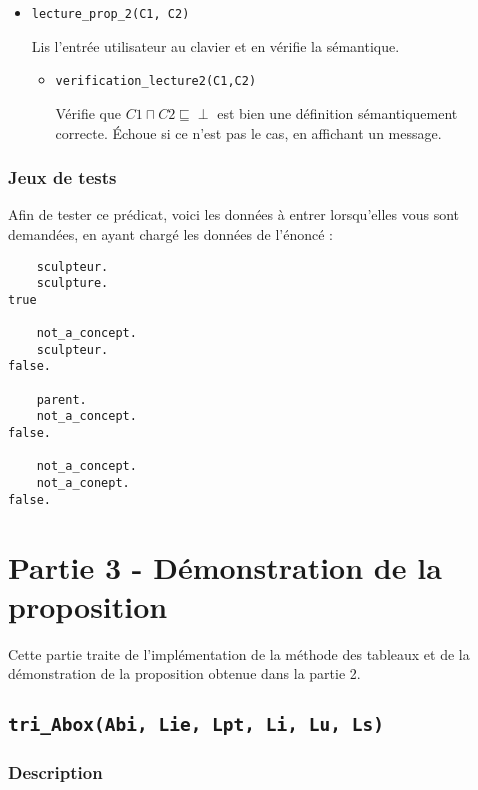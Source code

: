 \documentclass{article}
\newcommand{\code}[1]{\colorbox{light-gray}{\texttt{#1}}}
\begin{document}
\begin{itemize}

    \item \code{lecture\_prop\_2(C1, C2)}

    Lis l'entrée utilisateur au clavier et en vérifie la sémantique.
    
    \begin{itemize}
        \item \code{verification\_lecture2(C1,C2)}

        Vérifie que $C1 \sqcap C2 \sqsubseteq \perp$ est bien une définition sémantiquement correcte. Échoue si ce n'est pas le cas, en affichant un message. 
    \end{itemize}
\end{itemize}
\subsubsection{Jeux de tests}

Afin de tester ce prédicat, voici les données à entrer lorsqu'elles vous sont demandées, en ayant chargé les données de l'énoncé :
\begin{verbatim}
    sculpteur.
    sculpture.
true

    not_a_concept.
    sculpteur.
false.

    parent.
    not_a_concept.
false.

    not_a_concept.
    not_a_conept.
false.
\end{verbatim}

\clearpage

\section{Partie 3 - Démonstration de la proposition}
Cette partie traite de l'implémentation de la méthode des tableaux et de la démonstration de la proposition obtenue dans la partie 2.


\subsection{\code{tri\_Abox(Abi, Lie, Lpt, Li, Lu, Ls)}}
\subsubsection{Description}
\end{document}
